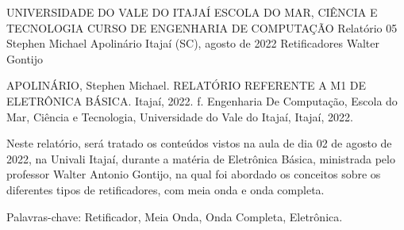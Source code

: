 
\begin{Info}
    {UNIVERSIDADE DO VALE DO ITAJAÍ}
    {ESCOLA DO MAR, CIÊNCIA E TECNOLOGIA}
    {CURSO DE ENGENHARIA DE COMPUTAÇÃO}
    {Relatório 05}
    {Stephen Michael Apolinário}
    {Itajaí (SC), agosto de 2022}
    {Retificadores}
    {Walter Gontijo}
    {}
    \end{Info}
    
    
    
    
    \begin{Resumo}
    
    APOLINÁRIO, Stephen Michael. RELATÓRIO REFERENTE A M1 DE ELETRÔNICA BÁSICA. Itajaí, 2022. \pageref{LastPage} f. Engenharia De Computação, Escola do Mar, Ciência e Tecnologia, Universidade do Vale do Itajaí, Itajaí, 2022.
    
    Neste relatório, será tratado os conteúdos vistos na aula de dia 02 de agosto de 2022, na Univali Itajaí, durante a matéria de Eletrônica Básica, ministrada pelo professor Walter Antonio Gontijo, na qual foi abordado os conceitos sobre os diferentes tipos de retificadores, com meia onda e onda completa.
    
    Palavras-chave: Retificador, Meia Onda, Onda Completa, Eletrônica.
    
    \end{Resumo}